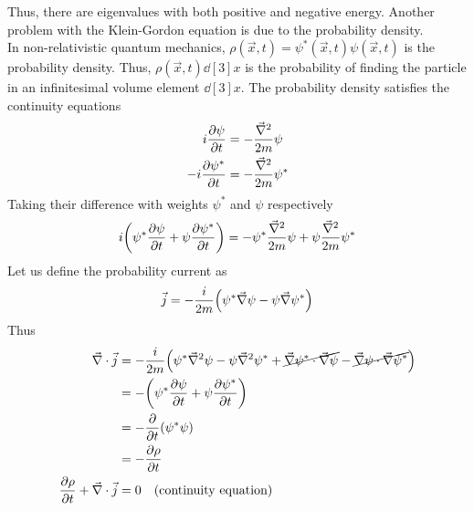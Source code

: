 \documentclass[12pt,a4paper,titlepage]{article}
\begin{document}
Thus, there are eigenvalues with both positive and negative energy. Another problem with the Klein-Gordon equation is due to the probability density.\\

In non-relativistic quantum mechanics, $\rho(\vec{x},t)=\psi^{*}(\vec{x},t)\psi(\vec{x},t)$ is the probability density. Thus, $\rho(\vec{x},t)\dd[3]{x}$ is the probability of finding the particle in an infinitesimal volume element $\dd[3]{x}$. The probability density satisfies the continuity equations
\begin{equation}
\begin{aligned}
i\pdv{\psi}{t}&=-\frac{\vec{\nabla}^{2}}{2m}\psi\\
-i\pdv{\psi^{*}}{t}&=-\frac{\vec{\nabla}^{2}}{2m}\psi^{*}
\end{aligned}
\end{equation}
Taking their difference with weights $\psi^{*}$ and $\psi$ respectively
\begin{equation}
i\qty(\psi^{*}\pdv{\psi}{t}+\psi\pdv{\psi^{*}}{t})=-\psi^{*}\frac{\vec{\nabla}^{2}}{2m}\psi+\psi\frac{\vec{\nabla}^{2}}{2m}\psi^{*}
\end{equation}
Let us define the probability current as
\begin{equation}
\vec{j}=-\frac{i}{2m}\qty(\psi^{*}\vec{\nabla}\psi-\psi\vec{\nabla}\psi^{*})
\end{equation}
Thus
\begin{equation}
\begin{aligned}
\vec{\nabla}\cdot\vec{j}&=-\frac{i}{2m}\qty(\psi^{*}\vec{\nabla}^{2}\psi-\psi\vec{\nabla}^{2}\psi^{*}+\cancel{\vec{\nabla}\psi^{*}\cdot\vec{\nabla}\psi}-\cancel{\vec{\nabla}\psi\cdot\vec{\nabla}\psi^{*}})\\
&=-\qty(\psi^{*}\pdv{\psi}{t}+\psi\pdv{\psi^{*}}{t})\\
&=-\pdv{t}\qty(\psi^{*}\psi)\\
&=-\pdv{\rho}{t}\\
\pdv{\rho}{t}+\vec{\nabla}\cdot\vec{j}&=0\qq{(continuity equation)}
\end{aligned}
\end{equation}
\end{document}
